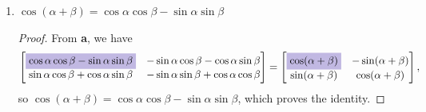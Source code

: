 \documentclass{article}
\begin{document}
\begin{enumerate}
\begin{enumerate}
\begin{proof}
\begin{align*}
\begin{bmatrix}
                \end{bmatrix} & \begin{bmatrix}
                    \cos\alpha\cos\beta + \sin\alpha\sin\beta&-\sin\alpha\cos\beta+\cos\alpha\sin\beta \\ 
                    -\cos\alpha\sin\beta + \sin\alpha\cos\beta& \sin\alpha\sin\beta + \cos\alpha\cos\beta
                \end{bmatrix}.
            \end{align*} Setting this to be equal to \(X\) and rearranging some terms, \[
                \begin{bmatrix}
                    \cos\alpha\cos\beta + \sin\alpha\sin\beta&-\sin\alpha\cos\beta+\cos\alpha\sin\beta \\ 
                    \colorbox{Periwinkle!42}{\(\sin\alpha\cos\beta -\cos\alpha\sin\beta\)} & \sin\alpha\sin\beta + \cos\alpha\cos\beta
                \end{bmatrix} = \begin{bmatrix}
                    \cos(\alpha - \beta)&-\sin(\alpha - \beta) \\ \colorbox{Periwinkle!42}{\(\sin(\alpha-\beta)\)}&\cos(\alpha - \beta)
                \end{bmatrix}
            \] gives us \(\sin(\alpha - \beta) = \sin\alpha\cos\beta - \cos\alpha\sin\beta\), which proves the identity. 
        \end{proof}
        \item \(\cos(\alpha + \beta) = \cos\alpha\cos\beta - \sin\alpha\sin\beta\)\begin{proof}
            From \textbf{a}, we have\[
                \begin{bmatrix}
                    \colorbox{Periwinkle!42}{\(\cos\alpha\cos\beta - \sin\alpha\sin\beta\)}&-\sin\alpha\cos\beta-\cos\alpha\sin\beta \\ 
                    \sin\alpha\cos\beta + \cos\alpha\sin\beta& -\sin\alpha\sin\beta + \cos\alpha\cos\beta
                \end{bmatrix} = \begin{bmatrix}
                    \colorbox{Periwinkle!42}{\(\cos(\alpha + \beta)\)}&-\sin(\alpha + \beta) \\ \sin(\alpha+\beta)&\cos(\alpha + \beta)
                \end{bmatrix},
            \] so \(\cos(\alpha + \beta) = \cos\alpha\cos\beta - \sin\alpha\sin\beta\), which proves the identity. 
        \end{proof}

\end{enumerate}
\end{enumerate}
\end{document}
